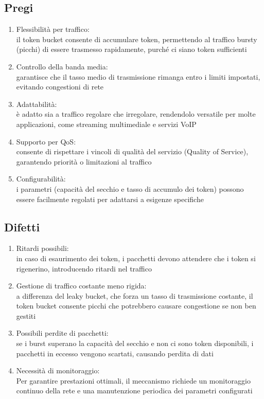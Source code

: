 \documentclass[10pt,oneside,a4paper]{article}
\begin{document}
\subsection{Pregi}
\begin{enumerate}
\item Flessibilità per traffico: \\
il token bucket consente di accumulare token, permettendo al traffico bursty (picchi) di essere trasmesso rapidamente, purché ci siano token sufficienti
\item Controllo della banda media:\\
garantisce che il tasso medio di trasmissione rimanga entro i limiti impostati, evitando congestioni di rete
\item Adattabilità:\\
è adatto sia a traffico regolare che irregolare, rendendolo versatile per molte applicazioni, come streaming multimediale e servizi VoIP
\item Supporto per QoS:\\
consente di rispettare i vincoli di qualità del servizio (Quality of Service), garantendo priorità o limitazioni al traffico
\item Configurabilità:\\
i parametri (capacità del secchio e tasso di accumulo dei token) possono essere facilmente regolati per adattarsi a esigenze specifiche
\end{enumerate}
\subsection{Difetti}
\begin{enumerate}
\item Ritardi possibili:\\
in caso di esaurimento dei token, i pacchetti devono attendere che i token si rigenerino, introducendo ritardi nel traffico
\item Gestione di traffico costante meno rigida:\\
a differenza del leaky bucket, che forza un tasso di trasmissione costante, il token bucket consente picchi che potrebbero causare congestione se non ben gestiti
\item Possibili perdite di pacchetti:\\
se i burst superano la capacità del secchio e non ci sono token disponibili, i pacchetti in eccesso vengono scartati, causando perdita di dati
\item Necessità di monitoraggio:\\
Per garantire prestazioni ottimali, il meccanismo richiede un monitoraggio continuo della rete e una manutenzione periodica dei parametri configurati
\end{enumerate}
\end{document}
